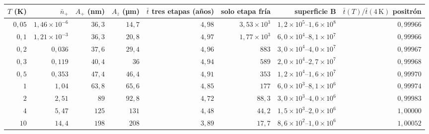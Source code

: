\begin{tabular}{rrrrrrrr}
\toprule
$T$ (K) & $\bar n_+$ & $A_+$ (nm) & $A_z$ (µm) & $\bar t$ tres etapas (años) & solo etapa fría & superficie B & $\bar t(T)/\bar t(4\,\mathrm{K})$ positrón \\
\midrule
$0{,}05$ & $1{,}46\times10^{-6}$ & $36{,}3$ & $14{,}7$ & $4{,}98$ & $3{,}53\times10^{3}$ & $1{,}2\times10^{5}$--$1{,}6\times10^{8}$ & $0{,}99966$ \\
$0{,}1$ & $1{,}21\times10^{-3}$ & $36{,}3$ & $20{,}8$ & $4{,}97$ & $1{,}77\times10^{3}$ & $6{,}0\times10^{4}$--$8{,}1\times10^{7}$ & $0{,}99966$ \\
$0{,}2$ & $0{,}036$ & $37{,}6$ & $29{,}4$ & $4{,}96$ & $883$ & $3{,}0\times10^{4}$--$4{,}0\times10^{7}$ & $0{,}99967$ \\
$0{,}3$ & $0{,}119$ & $40{,}4$ & $36$ & $4{,}94$ & $589$ & $2{,}0\times10^{4}$--$2{,}7\times10^{7}$ & $0{,}99968$ \\
$0{,}5$ & $0{,}353$ & $47{,}4$ & $46{,}4$ & $4{,}91$ & $353$ & $1{,}2\times10^{4}$--$1{,}6\times10^{7}$ & $0{,}99970$ \\
$1$ & $1{,}04$ & $63{,}8$ & $65{,}6$ & $4{,}85$ & $177$ & $6{,}0\times10^{3}$--$8{,}1\times10^{6}$ & $0{,}99974$ \\
$2$ & $2{,}51$ & $89$ & $92{,}8$ & $4{,}72$ & $88{,}3$ & $3{,}0\times10^{3}$--$4{,}0\times10^{6}$ & $0{,}99983$ \\
$4$ & $5{,}47$ & $125$ & $131$ & $4{,}48$ & $44{,}2$ & $1{,}5\times10^{3}$--$2{,}0\times10^{6}$ & $1{,}00000$ \\
$10$ & $14{,}4$ & $198$ & $208$ & $3{,}89$ & $17{,}7$ & $8{,}6\times10^{2}$--$1{,}0\times10^{6}$ & $1{,}00052$ \\
\bottomrule
\end{tabular}
